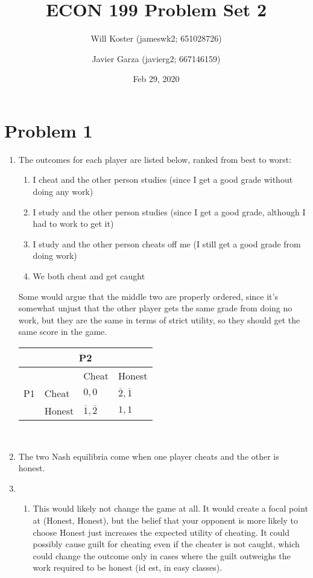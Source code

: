 \documentclass[letterpaper]{article}
\begin{document}
\title{ECON 199 Problem Set 2}
\author{Will Koster (jameswk2; 651028726) \and Javier Garza (javierg2; 667146159)}
\date{Feb 29, 2020}
\maketitle

\clearpage

\section{Problem 1}
\begin{enumerate}
    \item The outcomes for each player are listed below, ranked from best to worst:
        \begin{enumerate}
            \item I cheat and the other person studies (since I get a good grade without doing any work)
            \item I study and the other person studies (since I get a good grade, although I had to work to get it)
            \item I study and the other person cheats off me (I still get a good grade from doing work)
            \item We both cheat and get caught
        \end{enumerate}
        Some would argue that the middle two are properly ordered, since it's somewhat unjust that the other player gets the same grade from doing no work, but they are the same in terms of strict utility, so they should get the same score in the game. \\
\begin{tabular}{|l|l|l|l|}
\multicolumn{4}{c}{P2}                      \\ \hline
\multirow{3}{*}{P1} &   & Cheat        & Honest        \\ \hline
                       & Cheat & $0,0$ & $\overline2, \overline1$ \\ \hline
                       & Honest & $\overline1, \overline2$ & $1,1$ \\ \hline
\end{tabular} \\
\item The two Nash equilibria come when one player cheats and the other is honest.
\item \begin{enumerate}
        \item This would likely not change the game at all. It would create a focal point at (Honest, Honest), but the belief that your opponent is more likely to choose Honest just increases the expected utility of cheating. It could possibly cause guilt for cheating even if the cheater is not caught, which could change the outcome only in cases where the guilt outweighs the work required to be honest (id est, in easy classes).

\end{enumerate}
\end{enumerate}
\end{document}
